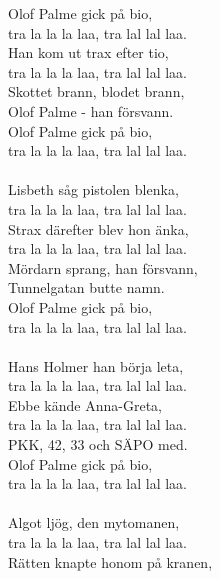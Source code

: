 
            Olof Palme gick på bio, \\
            tra la la la laa, tra lal lal laa. \\
            Han kom ut trax efter tio, \\
            tra la la la laa, tra lal lal laa. \\
            Skottet brann, blodet brann, \\
            Olof Palme - han försvann. \\
            Olof Palme gick på bio, \\
            tra la la la laa, tra lal lal laa. \\
\hspace{10mm} \\
            Lisbeth såg pistolen blenka, \\
            tra la la la laa, tra lal lal laa. \\
            Strax därefter blev hon änka, \\
            tra la la la laa, tra lal lal laa. \\
            Mördarn sprang, han försvann, \\
            Tunnelgatan butte namn. \\
            Olof Palme gick på bio, \\
            tra la la la laa, tra lal lal laa. \\
\hspace{10mm} \\
            Hans Holmer han börja leta, \\
            tra la la la laa, tra lal lal laa. \\
            Ebbe kände Anna-Greta, \\
            tra la la la laa, tra lal lal laa. \\
            PKK, 42, 33 och SÄPO med. \\
            Olof Palme gick på bio, \\
            tra la la la laa, tra lal lal laa. \\
\hspace{10mm} \\
            Algot ljög, den mytomanen, \\
            tra la la la laa, tra lal lal laa. \\
            Rätten knapte honom på kranen, \\
